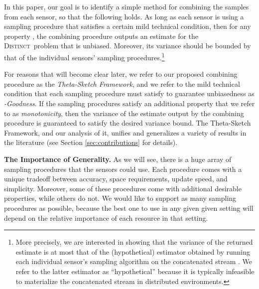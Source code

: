 \documentclass{article}
\newcommand{\eat}[1]{}
\newcommand{\distinctP}{\textsc{Distinct}}
\begin{document}
In this paper, our goal is to identify a simple method for combining the samples from each sensor, so that the following holds.
As long as each sensor is using a sampling procedure that satisfies a certain mild technical condition, then for any property , the combining procedure outputs an estimate for
the \distinctP\ problem that is unbiased. Moreover, its variance should be bounded by that of the individual sensors' sampling procedures.\footnote{More precisely,
we are interested in showing that
the variance of the returned estimate is at most that of the (hypothetical) estimator obtained by running each individual sensor's sampling algorithm on the concatenated stream .
We refer to the latter estimator as ``hypothetical'' because it is typically infeasible to materialize the concatenated stream in distributed environments.} 


For reasons that will become clear later, we refer to our proposed combining procedure as the \emph{Theta-Sketch Framework}, and we refer to the mild technical condition
that each sampling procedure must satisfy to guarantee unbiasedness as \emph{-Goodness}. If the sampling procedures
satisfy an additional property that we refer to as \emph{monotonicity}, then the variance of the estimate output by the combining procedure is guaranteed to satisfy the desired variance bound. The Theta-Sketch Framework, and our analysis of it, unifies and generalizes a variety of results in the literature (see Section \ref{sec:contributions} for details). 

\medskip
\noindent \textbf{The Importance of Generality.} As we will see, there is a huge array of sampling procedures that the sensors could use. Each procedure comes with a unique tradeoff between 
accuracy, space requirements, update speed, and simplicity. Moreover, some of these procedures come with additional desirable properties, while others do not. We would like to support as many sampling procedures as possible, because the best one to use in any given given setting
will depend on the relative importance of each resource in that setting. 

\eat{In addition, there are realistic scenarios where different sensors may use different sampling procedures, or may use the same sampling procedure but with different settings of parameters. 
For example, if different sensors have different amounts of available memory (say, because some sensors are newer than others), then the sensors with less memory will have to downsample 
more aggressively than the others. 
The guarantees of the Theta-Sketch Framework continue to hold when different sensors use different sampling procedures, as long as all of the sampling procedures used satisfy 1-Goodness. }
\end{document}

